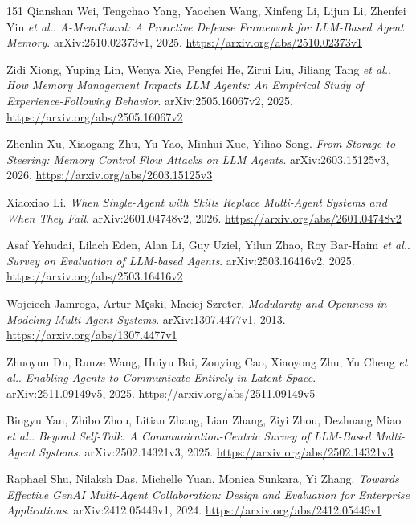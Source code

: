 \documentclass[11pt,a4paper]{article}
\begin{document}
\begin{thebibliography}{151}
Qianshan Wei, Tengchao Yang, Yaochen Wang, Xinfeng Li, Lijun Li, Zhenfei Yin \emph{et al.}.
\newblock \emph{A-MemGuard: A Proactive Defense Framework for LLM-Based Agent Memory}.
\newblock arXiv:2510.02373v1, 2025.
\newblock \url{https://arxiv.org/abs/2510.02373v1}

Zidi Xiong, Yuping Lin, Wenya Xie, Pengfei He, Zirui Liu, Jiliang Tang \emph{et al.}.
\newblock \emph{How Memory Management Impacts LLM Agents: An Empirical Study of Experience-Following Behavior}.
\newblock arXiv:2505.16067v2, 2025.
\newblock \url{https://arxiv.org/abs/2505.16067v2}

Zhenlin Xu, Xiaogang Zhu, Yu Yao, Minhui Xue, Yiliao Song.
\newblock \emph{From Storage to Steering: Memory Control Flow Attacks on LLM Agents}.
\newblock arXiv:2603.15125v3, 2026.
\newblock \url{https://arxiv.org/abs/2603.15125v3}

Xiaoxiao Li.
\newblock \emph{When Single-Agent with Skills Replace Multi-Agent Systems and When They Fail}.
\newblock arXiv:2601.04748v2, 2026.
\newblock \url{https://arxiv.org/abs/2601.04748v2}

Asaf Yehudai, Lilach Eden, Alan Li, Guy Uziel, Yilun Zhao, Roy Bar-Haim \emph{et al.}.
\newblock \emph{Survey on Evaluation of LLM-based Agents}.
\newblock arXiv:2503.16416v2, 2025.
\newblock \url{https://arxiv.org/abs/2503.16416v2}

Wojciech Jamroga, Artur M\c{e}ski, Maciej Szreter.
\newblock \emph{Modularity and Openness in Modeling Multi-Agent Systems}.
\newblock arXiv:1307.4477v1, 2013.
\newblock \url{https://arxiv.org/abs/1307.4477v1}

Zhuoyun Du, Runze Wang, Huiyu Bai, Zouying Cao, Xiaoyong Zhu, Yu Cheng \emph{et al.}.
\newblock \emph{Enabling Agents to Communicate Entirely in Latent Space}.
\newblock arXiv:2511.09149v5, 2025.
\newblock \url{https://arxiv.org/abs/2511.09149v5}

Bingyu Yan, Zhibo Zhou, Litian Zhang, Lian Zhang, Ziyi Zhou, Dezhuang Miao \emph{et al.}.
\newblock \emph{Beyond Self-Talk: A Communication-Centric Survey of LLM-Based Multi-Agent Systems}.
\newblock arXiv:2502.14321v3, 2025.
\newblock \url{https://arxiv.org/abs/2502.14321v3}

Raphael Shu, Nilaksh Das, Michelle Yuan, Monica Sunkara, Yi Zhang.
\newblock \emph{Towards Effective GenAI Multi-Agent Collaboration: Design and Evaluation for Enterprise Applications}.
\newblock arXiv:2412.05449v1, 2024.
\newblock \url{https://arxiv.org/abs/2412.05449v1}


\end{thebibliography}
\end{document}
